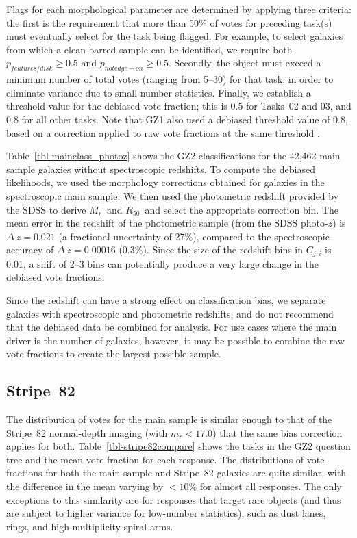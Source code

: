 \documentclass[useAMS,usenatbib]{mn2e}
\newcommand{\mr}{$M_r$}
\newcommand{\rfifty}{$R_{50}$}
\begin{document}
Flags for each morphological parameter are determined by applying three criteria: the first is the requirement that more than 50\% of votes for preceding task(s) must eventually select for the task being flagged. For example, to select galaxies from which a clean barred sample can be identified, we require both $p_{features/disk}\geq0.5$ and $p_{not edge-on}\geq0.5$. Secondly, the object must exceed a minimum number of total votes (ranging from 5--30) for that task, in order to eliminate variance due to small-number statistics. Finally, we establish a threshold value for the debiased vote fraction; this is 0.5 for Tasks~02 and 03, and 0.8 for all other tasks. Note that GZ1 also used a debiased threshold value of 0.8, based on a correction applied to raw vote fractions at the same threshold \citep{bam09,lin11}. 

Table~\ref{tbl-mainclass_photoz} shows the GZ2 classifications for the 42,462 main sample galaxies without spectroscopic redshifts. To compute the debiased likelihoods, we used the morphology corrections obtained for galaxies in the spectroscopic main sample. We then used the photometric redshift provided by the SDSS \citep{csa03} to derive \mr~and \rfifty~and select the appropriate correction bin. The mean error in the redshift of the photometric sample (from the SDSS photo-$z$) is $\Delta~z=0.021$ (a fractional uncertainty of 27\%), compared to the spectroscopic accuracy of $\Delta~z=0.00016$ (0.3\%). Since the size of the redshift bins in $C_{j,i}$ is 0.01, a shift of 2--3 bins can potentially produce a very large change in the debiased vote fractions. 

Since the redshift can have a strong effect on classification bias, we separate galaxies with spectroscopic and photometric redshifts, and do not recommend that the debiased data be combined for analysis. For use cases where the main driver is the number of galaxies, however, it may be possible to combine the raw vote fractions to create the largest possible sample.

\subsection{Stripe~82}\label{ssec-s82}

The distribution of votes for the main sample is similar enough to that of the Stripe~82 normal-depth imaging (with $m_r<17.0$) that the same bias correction applies for both. Table~\ref{tbl-stripe82compare} shows the tasks in the GZ2 question tree and the mean vote fraction for each response. The distributions of vote fractions for both the main sample and Stripe~82 galaxies are quite similar, with the difference in the mean varying by $<10\%$ for almost all responses. The only exceptions to this similarity are for responses that target rare objects (and thus are subject to higher variance for low-number statistics), such as dust lanes, rings, and high-multiplicity spiral arms. 
\end{document}
